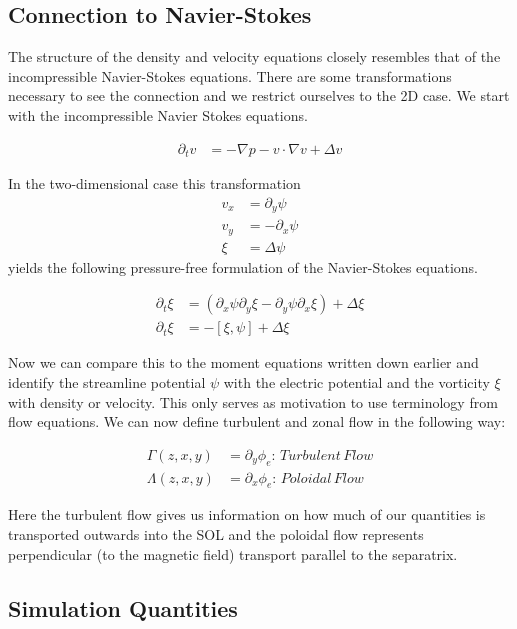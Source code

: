 \documentclass[master.tex]{subfiles}
\begin{document}
\subsection{Connection to Navier-Stokes}
\label{sec:connection_navier_stokes}

The structure of the density and velocity equations closely resembles that of the incompressible Navier-Stokes equations.
There are some transformations necessary to see the connection and we restrict ourselves to the 2D case. We start with the incompressible Navier Stokes equations.

\begin{align}
    \partial_t v &= - \nabla p - v \cdot \nabla v + \Delta v
\end{align}

In the two-dimensional case this transformation
\begin{align}
    v_x &= \partial_y \psi \\
    v_y &= -\partial_x \psi \\
    \xi &= \Delta \psi
\end{align}
yields the following pressure-free formulation of the Navier-Stokes equations.

\begin{align}
    \partial_t \xi &= \left( \partial_x \psi \partial_y \xi - \partial_y \psi \partial_x \xi  \right) + \Delta \xi\\
    \partial_t \xi &= - \left[\xi, \psi\right] + \Delta \xi
\end{align}

Now we can compare this to the moment equations written down earlier and identify the streamline potential $\psi$ with the electric potential and the vorticity $\xi$ with density or velocity. This only serves as motivation to use terminology from flow equations. We can now define turbulent and zonal flow in the following way:

\begin{align}
    \Gamma(z,x,y) &= \partial_y \phi_e :\, Turbulent\,Flow\\
    \Lambda(z,x,y) &= \partial_x \phi_e :\, Poloidal\,Flow
\end{align}

Here the turbulent flow gives us information on how much of our quantities is transported outwards into the \ac{SOL} and the poloidal flow represents perpendicular (to the magnetic field) transport parallel to the separatrix.

\subsection{Simulation Quantities}\label{sec:simulation_quantities}
\end{document}
